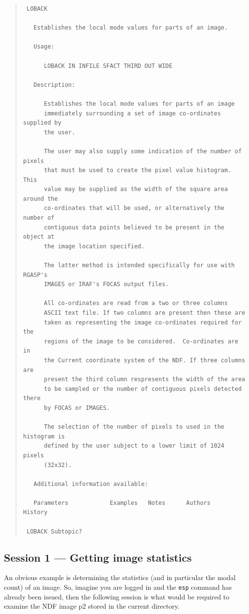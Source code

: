 \documentclass[twoside,11pt]{article}
\newcommand{\xlabel}[1]{}
\newenvironment{myquote}{\begin{quote}\begin{small}}{\end{small}\end{quote}}
\begin{document}
\begin{myquote}
\begin{verbatim}
 LOBACK

   Establishes the local mode values for parts of an image.

   Usage:

      LOBACK IN INFILE SFACT THIRD OUT WIDE

   Description:

      Establishes the local mode values for parts of an image
      immediately surrounding a set of image co-ordinates supplied by
      the user.

      The user may also supply some indication of the number of pixels
      that must be used to create the pixel value histogram. This
      value may be supplied as the width of the square area around the
      co-ordinates that will be used, or alternatively the number of
      contiguous data points believed to be present in the object at
      the image location specified.

      The latter method is intended specifically for use with RGASP's
      IMAGES or IRAF's FOCAS output files.

      All co-ordinates are read from a two or three columns
      ASCII text file. If two columns are present then these are
      taken as representing the image co-ordinates required for the
      regions of the image to be considered.  Co-ordinates are in
      the Current coordinate system of the NDF. If three columns are
      present the third column respresents the width of the area
      to be sampled or the number of contiguous pixels detected there
      by FOCAS or IMAGES.

      The selection of the number of pixels to used in the histogram is
      defined by the user subject to a lower limit of 1024 pixels
      (32x32).

   Additional information available:

   Parameters            Examples   Notes      Authors    History

 LOBACK Subtopic?
\end{verbatim}
\end{myquote}


\subsection{Session 1 --- Getting image statistics}
\xlabel{SESSION1}

An obvious example is determining the statistics (and in particular the
modal count)  of an image. So, imagine you are logged in and the
{\tt esp} command has already been issued, then the following session is
what would be required to examine the NDF image p2 stored in the
current directory.
\end{document}
